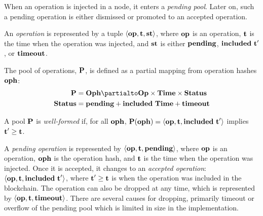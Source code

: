 \documentclass[a4paper]{llncs}
\begin{document}
When an operation is injected in a node, it enters a \emph{pending
  pool}. Later on, such a pending operation is either dismissed or
promoted to an accepted operation.

 \begin{definition}%
An \emph{operation} is represented by a tuple  $\langle  \textbf{op}, \textbf{t}, \textbf{st}
\rangle $, where $\textbf{op}$ is an operation, $\textbf{t}$ is the time when the
operation was injected, and $\textbf{st}$ is either $\textbf{pending}$,
$\textbf{included}\ \textbf{t}'$, or $\textbf{timeout}$.  
\end{definition}
\begin{definition}
  The pool of operations, $\textbf{P}$, is defined as a partial mapping from
  operation hashes $\textbf{oph}$:
  \begin{align*}
    \PENDING &= \TOPH \partialto \TOP\times \TTIME \times \TSTATUS \\
    \TSTATUS&= \STATUSPENDING + \STATUSINCLUDED\ \TTIME + \STATUSTIMEOUT
  \end{align*}
  
  A pool $\textbf{P}$ is \emph{well-formed} if, for all $\textbf{oph}$, $\textbf{P} (\textbf{oph}) =
  \langle\textbf{op},\textbf{t}, \textbf{included}\ \textbf{t}'\rangle$ implies $\textbf{t}' \ge \textbf{t}$.
\end{definition}


A \emph{pending operation} is represented by
$\langle  \textbf{op}, \textbf{t}, \textbf{pending}\rangle $,
where $\textbf{op}$ is an operation, $\textbf{oph}$ is the operation hash,
and $\textbf{t}$ is the time when the operation was injected.
Once it is accepted, it changes to an \emph{accepted operation}:
$\langle  \textbf{op}, \textbf{t}, \textbf{included}\ \textbf{t}'\rangle $, where
$\textbf{t}' \ge \textbf{t}$ is  when the operation was included in the
blockchain.  The operation can also be dropped at any time, which is
represented by
$\langle  \textbf{op}, \textbf{t}, \textbf{timeout}\rangle $. There are several
causes for dropping, primarily timeout or overflow of the pending
pool which is limited in size in the implementation.



\end{document}
